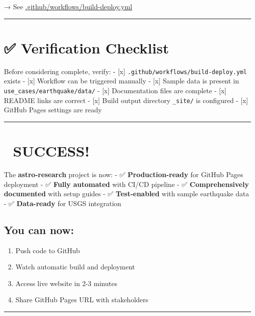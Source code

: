 \documentclass[
  11pt,
  oneside,
  openany]{scrbook}
\providecommand{\tightlist}{%
  \setlength{\itemsep}{0pt}\setlength{\parskip}{0pt}}\usepackage{longtable,booktabs,array}
\begin{document}
→ See \url{.github/workflows/build-deploy.yml}

\begin{center}\rule{0.5\linewidth}{0.5pt}\end{center}

\chapter{✅ Verification Checklist}\label{verification-checklist}

Before considering complete, verify: - {[}x{]}
\texttt{.github/workflows/build-deploy.yml} exists - {[}x{]} Workflow
can be triggered manually - {[}x{]} Sample data is present in
\texttt{use\_cases/earthquake/data/} - {[}x{]} Documentation files are
complete - {[}x{]} README links are correct - {[}x{]} Build output
directory \texttt{\_site/} is configured - {[}x{]} GitHub Pages settings
are ready

\begin{center}\rule{0.5\linewidth}{0.5pt}\end{center}

\chapter{🎉 SUCCESS!}\label{success}

The \textbf{astro-research} project is now: - ✅
\textbf{Production-ready} for GitHub Pages deployment - ✅ \textbf{Fully
automated} with CI/CD pipeline - ✅ \textbf{Comprehensively documented}
with setup guides - ✅ \textbf{Test-enabled} with sample earthquake data
- ✅ \textbf{Data-ready} for USGS integration

\section{\texorpdfstring{\textbf{You can
now:}}{You can now:}}\label{you-can-now}

\begin{enumerate}
\def\labelenumi{\arabic{enumi}.}
\tightlist
\item
  Push code to GitHub
\item
  Watch automatic build and deployment
\item
  Access live website in 2-3 minutes
\item
  Share GitHub Pages URL with stakeholders
\end{enumerate}

\begin{center}\rule{0.5\linewidth}{0.5pt}\end{center}
\end{document}
